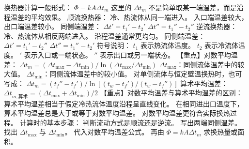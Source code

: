 
换热器计算一般形式：
$\Phi=kA\Delta t_m$
这里的 $\Delta t_m$ 不是简单取某一端温差，而是沿程温差的平均效果。
顺流换热器：
冷、热流体从同一端进入。
入口端温差较大，出口端温差较小。
同侧端温差：
$\Delta t'=t_1'-t_2'$
$\Delta t''=t_1''-t_2''$
逆流换热器：
冷、热流体从相反两端进入。
沿程温差通常更均匀。
同侧端温差：
$\Delta t'=t_1'-t_2''$
$\Delta t''=t_1''-t_2'$
符号说明：
$t_1$ 表示热流体温度。
$t_2$ 表示冷流体温度。
$'$ 表示入口或一端状态。
$''$ 表示出口或另一端状态。
【重点】对数平均温差：
$\Delta t_m=(\Delta t_{\max}-\Delta t_{\min})/\ln(\Delta t_{\max}/\Delta t_{\min})$
$\Delta t_{\max}$：同侧流体温差中的较大值。
$\Delta t_{\min}$：同侧流体温差中的较小值。
对单侧流体与恒定壁温换热时，也可写成：
$\Delta t_m=(t_f''-t_f')/\ln[(t_w-t_f')/(t_w-t_f'')]$
算术平均温差：
$\Delta t_{m,\mathrm{算术}}=(\Delta t_{\max}+\Delta t_{\min})/2$
【重点】对数平均温差与算术平均温差的区别：
算术平均温差相当于假定冷热流体温度沿程呈直线变化。
在相同进出口温度下，算术平均温差总是大于或等于对数平均温差。
对数平均温差更符合实际换热过程。
计算时的基本步骤：
判断流动方式是顺流还是逆流。
写出两端同侧温差。
找出 $\Delta t_{\max}$ 与 $\Delta t_{\min}$。
代入对数平均温差公式。
再由 $\Phi=kA\Delta t_m$ 求换热量或面积。
